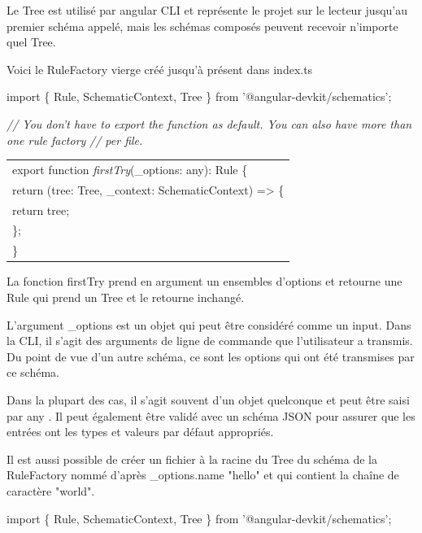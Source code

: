 \documentclass[12pt,french]{article}
\begin{document}
	Le Tree est utilisé par angular CLI et représente le projet sur le lecteur jusqu'au premier schéma appelé, mais les schémas composés peuvent recevoir n’importe quel Tree.\newline
	
	Voici le RuleFactory vierge créé jusqu'à présent dans index.ts\newline
	
	import \{ Rule, SchematicContext, Tree \} from '@angular-devkit/schematics';\newline
	
	\textit{// You don't have to export the function as default. You can also have more than one rule factory}\newline
	\textit{// per file.}\newline
	
	\begin{tabular}{l}
		export function \textit{firstTry}(\_options: any): Rule \{\\
		\quad return (tree: Tree, \_context: SchematicContext) => \{\\
		\qquad return tree;\\
		\quad\};\\
		\}\\
	\end{tabular}\break

	La fonction firstTry prend en argument un ensembles d'options et retourne une Rule qui prend un Tree et le retourne inchangé.\newline
	
	L'argument \_options est un objet qui peut être considéré comme un input. Dans la CLI, il s'agit des arguments de ligne de commande que l'utilisateur a transmis. Du point de vue d'un autre schéma, ce sont les options qui ont été transmises par ce schéma.\newline
	
	Dans la plupart des cas, il s’agit souvent d’un objet quelconque et peut être saisi par any . Il peut également être validé avec un schéma JSON pour assurer que les entrées ont les types et valeurs par défaut appropriés.\newline
	
	Il est aussi possible de créer un fichier à la racine du Tree du schéma de la RuleFactory nommé d'après \_options.name "hello" et qui contient la chaîne de caractère "world". \newline
	
	import \{ Rule, SchematicContext, Tree \} from '@angular-devkit/schematics';\newline
	
\end{document}
